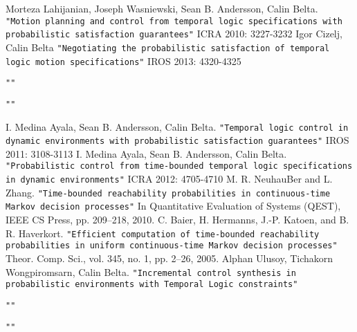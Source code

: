 \documentclass{article}
\theoremstyle{definition}
\begin{document}
\begin{thebibliography}{}
Morteza Lahijanian, Joseph Wasniewski, Sean B. Andersson, Calin Belta.
\texttt{"Motion planning and control from temporal logic specifications with probabilistic satisfaction guarantees"}
ICRA 2010: 3227-3232
Igor Cizelj, Calin Belta
\texttt{"Negotiating the probabilistic satisfaction of temporal logic motion specifications"}
IROS 2013: 4320-4325

\texttt{""}


\texttt{""}


I. Medina Ayala, Sean B. Andersson, Calin Belta.
\texttt{"Temporal logic control in dynamic environments with probabilistic satisfaction guarantees"}
IROS 2011: 3108-3113
I. Medina Ayala, Sean B. Andersson, Calin Belta.
\texttt{"Probabilistic control from time-bounded temporal logic specifications in dynamic environments"}
ICRA 2012: 4705-4710
M. R. NeuhauBer and L. Zhang.
\texttt{"Time-bounded reachability probabilities
in continuous-time Markov decision processes"}
In Quantitative Evaluation of Systems (QEST), IEEE CS Press, pp. 209–218, 2010.
C. Baier, H. Hermanns, J.-P. Katoen, and B. R. Haverkort.
\texttt{"Efficient computation of time-bounded reachability probabilities in uniform continuous-time Markov decision processes"}
Theor. Comp. Sci., vol. 345, no. 1, pp. 2–26, 2005.
Alphan Ulusoy, Tichakorn Wongpiromsarn, Calin Belta.
\texttt{"Incremental control synthesis in probabilistic environments with Temporal Logic constraints"}

\texttt{""}

\texttt{""}


\end{thebibliography}
\end{document}
